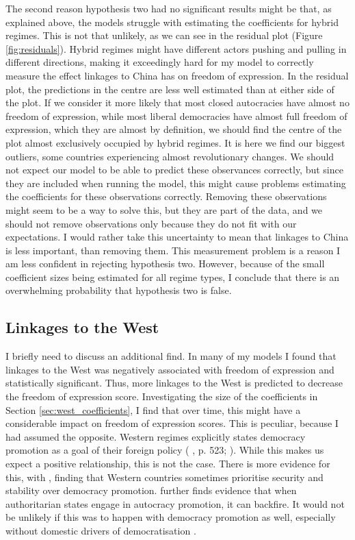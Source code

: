 The second reason hypothesis two had no significant results might be that, as explained above, the models struggle with estimating the coefficients for hybrid regimes. This is not that unlikely, as we can see in the residual plot (Figure \ref{fig:residuals}). Hybrid regimes might have different actors pushing and pulling in different directions, making it exceedingly hard for my model to correctly measure the effect linkages to China has on freedom of expression. In the residual plot, the predictions in the centre are less well estimated than at either side of the plot. If we consider it more likely that most closed autocracies have almost no freedom of expression, while most liberal democracies have almost full freedom of expression, which they are almost by definition, we should find the centre of the plot almost exclusively occupied by hybrid regimes. It is here we find our biggest outliers, some countries experiencing almost revolutionary changes. We should not expect our model to be able to predict these observances correctly, but since they are included when running the model, this might cause problems estimating the coefficients for these observations correctly. Removing these observations might seem to be a way to solve this, but they are part of the data, and we should not remove observations only because they do not fit with our expectations. I would rather take this uncertainty to mean that linkages to China is less important, than removing them. This measurement problem is a reason I am less confident in rejecting hypothesis two. However, because of the small coefficient sizes being estimated for all regime types, I conclude that there is an overwhelming probability that hypothesis two is false. 

\subsection{Linkages to the West}
I briefly need to discuss an additional find. In many of my models I found that linkages to the West was negatively associated with freedom of expression and statistically significant. Thus, more linkages to the West is predicted to decrease the freedom of expression score. Investigating the size of the coefficients in Section \ref{sec:west_coefficients}, I find that over time, this might have a considerable impact on freedom of expression scores. This is peculiar, because I had assumed the opposite. Western regimes explicitly states democracy promotion as a goal of their foreign policy (\citeauthor{borzel_noble_2015} \citeyear{borzel_noble_2015}, p. 523; \citeauthor{levitsky_linkage_2006} \citeyear{levitsky_linkage_2006}). While this makes us expect a positive relationship, this is not the case. There is more evidence for this, with \citet[pp. 523-524]{borzel_noble_2015}, \citet[pp. 464-466]{delcour_spoiler_2015} \citet{freyburg_local_2015} finding that Western countries sometimes prioritise security and stability over democracy promotion. \citep{delcour_spoiler_2015} further finds evidence that when authoritarian states engage in autocracy promotion, it can backfire. It would not be unlikely if this was to happen with democracy promotion as well, especially without domestic drivers of democratisation \citep{risse_democracy_2015}.

